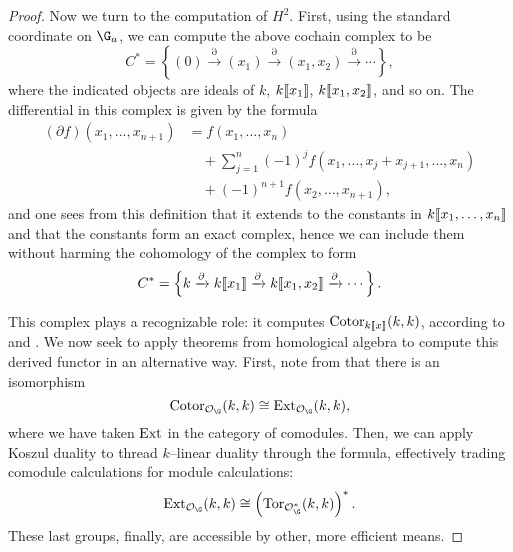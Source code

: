 \begin{proof}
Now we turn to the computation of \(H^2\).  First, using the standard coordinate on \(\G_a\), we can compute the above cochain complex to be \[C^* = \left\{ (0) \xrightarrow{\partial} (x_1) \xrightarrow{\partial} (x_1, x_2) \xrightarrow{\partial} \cdots \right\},\] where the indicated objects are ideals of \(k\), \(k\llbracket{x_1}\rrbracket\), \(k\llbracket{x_1, x_2}\rrbracket\), and so on.  The differential in this complex is given by the formula
\begin{align*}
(\partial f)(x_1, \ldots, x_{n+1}) & = f(x_1, \ldots, x_n) \\
& \quad + \sum_{j=1}^n (-1)^j f(x_1, \ldots, x_j + x_{j+1}, \ldots, x_n) \\
& \quad + (-1)^{n+1} f(x_2, \ldots, x_{n+1}),
\end{align*}
and one sees from this definition that it extends to the constants in \(k\llbracket{x_1, \ldots, x_n}\rrbracket\) and that the constants form an exact complex, hence we can include them without harming the cohomology of the complex to form \[C^* = \left\{ k \xrightarrow{\partial} k\llbracket{x_1}\rrbracket \xrightarrow{\partial} k\llbracket{x_1, x_2}\rrbracket \xrightarrow{\partial} \cdots \right\}.\]

This complex plays a recognizable role: it computes \(\operatorname{Cotor}_{k\llbracket{x}\rrbracket}(k, k)\), according to  and .  We now seek to apply theorems from homological algebra to compute this derived functor in an alternative way.  First, note from  that there is an isomorphism \[\Cotor_{\sheaf O_{\G}}(k, k) \cong \Ext_{\sheaf O_{\G}}(k, k),\] where we have taken \(\operatorname{Ext}\) in the category of comodules.  Then, we can apply Koszul duality to thread \(k\)--linear duality through the formula, effectively trading comodule calculations for module calculations: \[\Ext_{\sheaf O_{\G}}(k, k) \cong \left(\Tor_{\sheaf O_{\G}^*}(k, k)\right)^*.\]  These last groups, finally, are accessible by other, more efficient means.


\end{proof}
